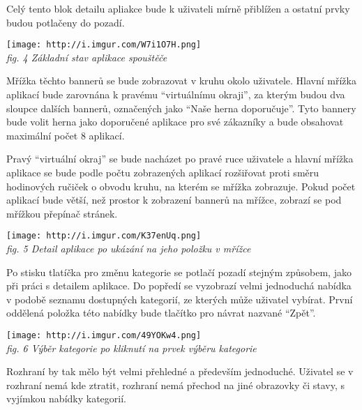 Celý tento blok
detailu apliakce bude k uživateli mírně přiblížen a ostatní prvky budou
potlačeny do pozadí.

\texttt{[image: http://i.imgur.com/W7i1O7H.png]}\\
\emph{fig. 4 Základní stav aplikace spouštěče}

Mřížka těchto bannerů se bude zobrazovat v kruhu okolo uživatele. Hlavní
mřížka aplikací bude zarovnána k pravému ``virtuálnímu okraji'', za
kterým budou dva sloupce dalších bannerů, označených jako ``Naše herna
doporučuje''. Tyto bannery bude volit herna jako doporučené aplikace pro
své zákazníky a bude obsahovat maximální počet 8 aplikací. 

Pravý ``virtuální okraj'' se bude nacházet po pravé ruce uživatele a hlavní
mřížka aplikace se bude podle počtu zobrazených aplikací rozšiřovat
proti směru hodinových ručiček o obvodu kruhu, na kterém se mřížka
zobrazuje. Pokud počet aplikací bude větší, než prostor k zobrazení
bannerů na mřížce, zobrazí se pod mřížkou přepínač stránek.

\texttt{[image: http://i.imgur.com/K37enUq.png]}\\
\emph{fig. 5 Detail aplikace po ukázání na jeho položku v mřížce}

Po stisku tlatíčka pro změnu kategorie se potlačí pozadí stejným
způsobem, jako při práci s detailem aplikace. Do popředí se vyzobrazí
velmi jednoduchá nabídka v podobě seznamu dostupných kategorií, ze
kterých může uživatel vybírat. První oddělená položka této nabídky bude
tlačítko pro návrat nazvané ``Zpět''.

\texttt{[image: http://i.imgur.com/49YOKw4.png]}\\
\emph{fig. 6 Výběr kategorie po kliknutí na prvek výběru kategorie}

Rozhraní by tak mělo být velmi přehledné a především jednoduché.
Uživatel se v rozhraní nemá kde ztratit, rozhraní nemá přechod na jiné
obrazovky či stavy, s vyjímkou nabídky kategorií.
